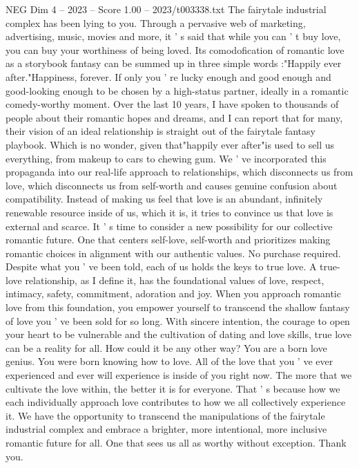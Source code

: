 \begin{textsample}{NEG Dim 4 – 2023 – Score 1.00 – 2023/t003338.txt}  \label{ex:f4_neg_054}
The fairytale industrial complex has been lying to you.
Through a pervasive web of marketing, advertising, music, movies and more, it ' s said that while you can ' t buy love, you can buy your worthiness of being loved.
Its comodofication of romantic love as a storybook fantasy can be summed up in three simple words :"Happily ever after."Happiness, forever.
If only you ' re lucky enough and good enough and good-looking enough to be chosen by a high-status partner, ideally in a romantic comedy-worthy moment.
Over the last 10 years, I have spoken to thousands of people about their romantic hopes and dreams, and I can report that for many, their vision of an ideal relationship is straight out of the fairytale fantasy playbook.
Which is no wonder, given that"happily ever after"is used to sell us everything, from makeup to cars to chewing gum.
We ' ve incorporated this propaganda into our real-life approach to relationships, which disconnects us from love, which disconnects us from self-worth and causes genuine confusion about compatibility.
Instead of making us feel that love is an abundant, infinitely renewable resource inside of us, which it is, it tries to convince us that love is external and scarce.
It ' s time to consider a new possibility for our collective romantic future.
One that centers self-love, self-worth and prioritizes making romantic choices in alignment with our authentic values.
No purchase required.
Despite what you ' ve been told, each of us holds the keys to true love.
A true-love relationship, as I define it, has the foundational values of love, respect, intimacy, safety, commitment, adoration and joy.
When you approach romantic love from this foundation, you empower yourself to transcend the shallow fantasy of love you ' ve been sold for so long.
With sincere intention, the courage to open your heart to be vulnerable and the cultivation of dating and love skills, true love can be a reality for all.
How could it be any other way?
You are a born love genius.
You were born knowing how to love.
All of the love that you ' ve ever experienced and ever will experience is inside of you right now.
The more that we cultivate the love within, the better it is for everyone.
That ' s because how we each individually approach love contributes to how we all collectively experience it.
We have the opportunity to transcend the manipulations of the fairytale industrial complex and embrace a brighter, more intentional, more inclusive romantic future for all.
One that sees us all as worthy without exception.
Thank you.

\end{textsample}
